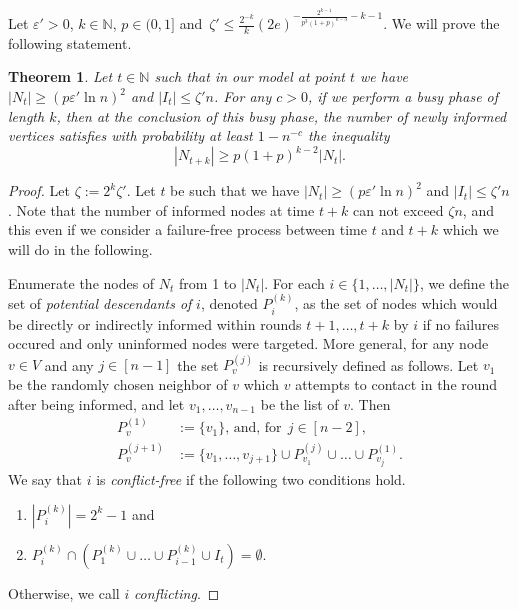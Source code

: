 \documentclass[12pt]{article}
\newtheorem{theorem}{Theorem}
\newcommand{\e}{\varepsilon}
\newcommand{\N}{{\mathbb{N}}}
\begin{document}
{Let $\e' > 0$, $k \in \N$, $p \in (0,1]$ and~$\zeta' \leq \frac{2^{-k}}{k}(2e)^{-\frac{2^{k-1}}{p^3(1+p)^{k-3}} - k - 1}.$ We will prove the following statement.

\begin{theorem}\label{1busyphase}
Let $t \in \N$ such that in our model at point $t$ we have $|N_{t}|\geq (p\e'\ln n)^2$ and $|I_{t}| \leq \zeta' n$.
For any $c >0$,
if we perform a busy phase of length $k$, then at the conclusion of this busy phase, the number of newly informed vertices satisfies with probability at least $1 - n^{-c}$ the inequality
\begin{equation*}|N_{t+k}|\geq p(1+p)^{k-2}|N_t|.\end{equation*}
\end{theorem}

\begin{proof}
Let $\zeta  := 2^{k}\zeta'.$
Let $t$ be such that we have $|N_{t}|\geq (p\e'\ln n)^2$ and $|I_{t}| \leq \zeta' n$. Note that the number of informed nodes at time $t+k$ can not exceed $\zeta n$, and this even if we consider a failure-free process between time $t$ and $t+k$ which we will do in the following.

Enumerate the nodes of $N_t$ from 1 to $|N_t|$. 
For each $i \in \{1, \dots, |N_t|\}$, we define the set of \emph{potential descendants of} $i$, denoted $P^{(k)}_i$, as the set of nodes which would be directly or indirectly informed within rounds $t+1,\dots,t+k$ by $i$ if no failures occured and only uninformed nodes were targeted. More general, for any node $v\in V$ and any $j \in [n-1]$ the set $P^{(j)}_v$ is recursively defined as follows.
Let $v_1$ be the randomly chosen neighbor of $v$ which $v$ attempts to contact in the round after being informed, and let $v_1,\dots,v_{n-1}$ be the list of $v$. Then
\begin{align*}
P^{(1)}_v &:= \{v_1\} \mbox{, and, for}\ \ j \in [n-2],\\
P^{(j+1)}_v &:= \{v_1,\dots,v_{j+1}\} \cup P^{(j)}_{v_1} \cup \dots \cup P^{(1)}_{v_j}.
\end{align*}
We say that $i$ is \emph{conflict-free} if the following two conditions hold.
	\begin{enumerate}
	\item $|P^{(k)}_i| = 2^k-1$ and
	\item $P^{(k)}_i\cap \left(P^{(k)}_1 \cup \dots \cup P^{(k)}_{i-1} \cup I_{t}\right) = \emptyset$. 
	\end{enumerate}	
Otherwise, we call $i$ \emph{conflicting}.


\end{proof}}
\end{document}
